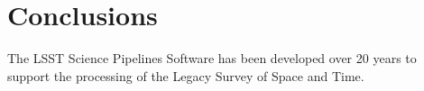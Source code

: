 \section{Conclusions}
\label{sec:conclusions}

The LSST Science Pipelines Software has been developed over 20 years to support the processing of the Legacy Survey of Space and Time.
